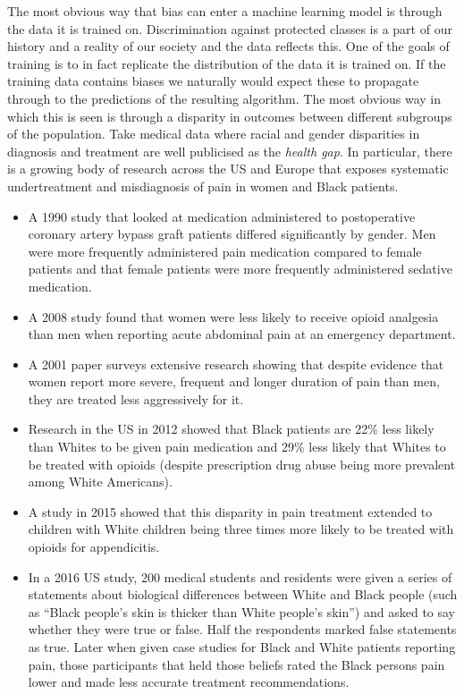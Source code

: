 The most obvious way that bias can enter a machine learning model is through the data it is trained on. Discrimination against protected classes is a part of our history and a reality of our society and the data reflects this. One of the goals of training is to in fact replicate the distribution of the data it is trained on. If the training data contains biases we naturally would expect these to propagate through to the predictions of the resulting algorithm. The most obvious way in which this is seen is through a disparity in outcomes between different subgroups of the population. Take medical data where racial and gender disparities in diagnosis and treatment are well publicised as the \emph{health gap}. In particular, there is a growing body of research across the US and Europe that exposes systematic undertreatment and misdiagnosis of pain in women and Black patients.
%
\begin{itemize}[leftmargin=*]
%
\item A 1990 study that looked at medication administered to postoperative coronary artery bypass graft patients differed significantly by gender. Men were more frequently administered pain medication compared to female patients and that female patients were more frequently administered sedative medication\cite{CalderoneSexRoles}.
%
\item A 2008 study found that women were less likely to receive opioid analgesia than men when reporting acute abdominal pain at an emergency department\cite{SexAnalgesic}.
%
\item A 2001 paper surveys extensive research showing that despite evidence that women report more severe, frequent and longer duration of pain than men, they are treated less aggressively for it\cite{GirlPain}.
%
\item Research in the US in 2012 showed that Black patients are 22\% less likely than Whites to be given pain medication and 29\% less likely that Whites to be treated with opioids (despite prescription drug abuse being more prevalent among White Americans).
%
\item A study in 2015 showed that this disparity in pain treatment extended to children with White children being three times more likely to be treated with opioids for appendicitis.
%
\item In a 2016 US study, 200 medical students and residents were given a series of statements about biological differences between White and Black people (such as ``Black people’s skin is thicker than White people’s skin'') and asked to say whether they were true or false. Half the respondents marked false statements as true. Later when given case studies for Black and White patients reporting pain, those participants that held those beliefs rated the Black persons pain lower and made less accurate treatment recommendations\cite{RacialBiasPain}.
%
\end{itemize}

